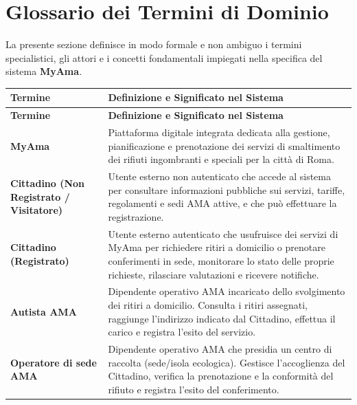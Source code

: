\section{Glossario dei Termini di Dominio}

La presente sezione definisce in modo formale e non ambiguo i termini specialistici, gli attori e i concetti fondamentali impiegati nella specifica del sistema \textbf{MyAma}.

\begin{center}
\renewcommand{\arraystretch}{1.3}
\begin{longtable}{|p{4.5cm}|p{11cm}|}
\hline
\rowcolor{tableheader} \textbf{Termine} & \textbf{Definizione e Significato nel Sistema} \\ \hline
\endfirsthead

\hline
\rowcolor{tableheader} \textbf{Termine} & \textbf{Definizione e Significato nel Sistema} \\ \hline
\endhead

\textbf{MyAma} & Piattaforma digitale integrata dedicata alla gestione, pianificazione e prenotazione dei servizi di smaltimento dei rifiuti ingombranti e speciali per la città di Roma. \\ \hline

\textbf{Cittadino (Non Registrato / Visitatore)} & Utente esterno non autenticato che accede al sistema per consultare informazioni pubbliche sui servizi, tariffe, regolamenti e sedi AMA attive, e che può effettuare la registrazione. \\ \hline

\textbf{Cittadino (Registrato)} & Utente esterno autenticato che usufruisce dei servizi di MyAma per richiedere ritiri a domicilio o prenotare conferimenti in sede, monitorare lo stato delle proprie richieste, rilasciare valutazioni e ricevere notifiche. \\ \hline

\textbf{Autista AMA} & Dipendente operativo AMA incaricato dello svolgimento dei ritiri a domicilio. Consulta i ritiri assegnati, raggiunge l'indirizzo indicato dal Cittadino, effettua il carico e registra l'esito del servizio. \\ \hline

\textbf{Operatore di sede AMA} & Dipendente operativo AMA che presidia un centro di raccolta (sede/isola ecologica). Gestisce l'accoglienza del Cittadino, verifica la prenotazione e la conformità del rifiuto e registra l'esito del conferimento. \\ \hline


\end{longtable}
\end{center}
